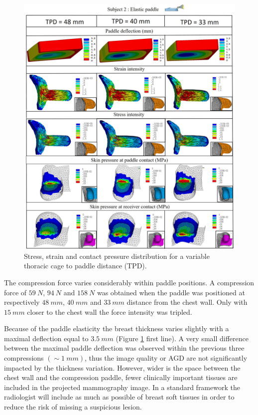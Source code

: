 \begin{figure}[!h]
\centering
\includegraphics[width=1\textwidth,keepaspectratio]{figures/elasticpaddleresults.jpg} 
\caption{Stress, strain and contact pressure distribution for a variable thoracic cage to paddle distance (TPD).}\label{fig:elasticpaddle}
\end{figure}

The compression force varies considerably within paddle positions. A compression force of $59\ N$, $94\ N$ and $158\ N$ was obtained when the paddle was positioned at respectively $48\  mm$, $40\  mm$ and $33\ mm$ distance from the chest wall. Only with $15\ mm$ closer to the chest wall the force intensity was tripled. 

Because of the paddle elasticity the breast thickness varies slightly with a maximal deflection equal to $3.5\ mm$ (Figure \ref{fig:elasticpaddle} first line). A very small difference between the maximal paddle deflection was observed within the previous three compressions   $(\sim 1\ mm)$, thus the image quality or AGD are not significantly impacted by the thickness variation. However, wider is the space between the chest wall and the compression paddle, fewer clinically important tissues are included in the projected mammography image. In a standard framework the radiologist will include as much as possible of breast soft tissues in order to reduce the risk of missing a suspicious lesion.


